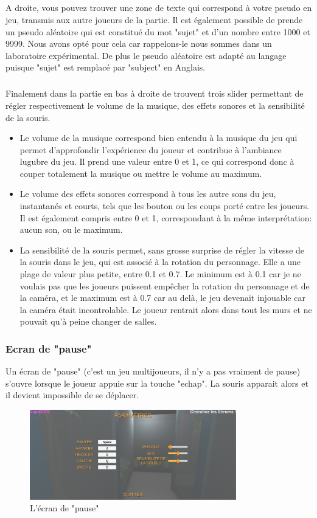 \documentclass{article}
\begin{document}
\subparagraph{}
A droite, vous pouvez trouver une zone de texte qui correspond à votre pseudo en jeu, transmis aux autre joueurs de la partie. Il est également possible de prende un pseudo aléatoire qui est constitué du mot "sujet" et d'un nombre entre 1000 et 9999. Nous avons opté pour cela car rappelons-le nous sommes dans un laboratoire expérimental. De plus le pseudo aléatoire est adapté au langage puisque "sujet" est remplacé par "subject" en Anglais.

\subparagraph{}
Finalement dans la partie en bas à droite de trouvent trois slider permettant de régler respectivement le volume de la musique, des effets sonores et la sensibilité de la souris.

\begin{itemize}
	\item{Le volume de la musique} correspond bien entendu à la musique du jeu qui permet d'approfondir l'expérience du joueur et contribue à l'ambiance lugubre du jeu. Il prend une valeur entre 0 et 1, ce qui correspond donc à couper totalement la musique ou mettre le volume au maximum.
	\item{Le volume des effets sonores} correspond à tous les autre sons du jeu, instantanés et courts, tels que les bouton ou les coups porté entre les joueurs. Il est également compris entre 0 et 1, correspondant à la même interprétation: aucun son, ou le maximum.
	\item{La sensibilité de la souris} permet, sans grosse surprise de régler la vitesse de la souris dans le jeu, qui est associé à la rotation du personnage. Elle a une plage de valeur plus petite, entre 0.1 et 0.7. Le minimum est à 0.1 car je ne voulais pas que les joueurs puissent empêcher la rotation du personnage et de la caméra, et le maximum est à 0.7 car au delà, le jeu devenait injouable car la caméra était incontrolable. Le joueur rentrait alors dans tout les murs et ne pouvait qu'à peine changer de salles.
\end{itemize}

\subsubsection{Ecran de "pause"}
Un écran de "pause" (c'est un jeu multijoueurs, il n'y a pas vraiment de pause) s'ouvre lorsque le joueur appuie sur la touche "echap". La souris apparait alors et il devient impossible de se déplacer.

\begin{figure}[H]
	\centering
	\includegraphics[width=0.8\textwidth]{Pause.png}
	\caption{L'écran de "pause"}
	\label{L'écran de "pause"}
\end{figure}
\end{document}
